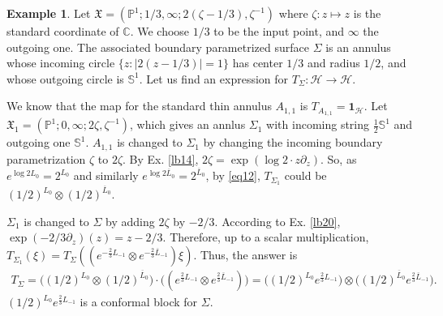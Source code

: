 \documentclass[12pt,a4paper,notitlepage]{article}
\theoremstyle{definition}
\newtheorem{eg}[df]{Example}
\theoremstyle{plain}
\newcommand{\fk}{\mathfrak}
\newcommand{\mc}{\mathcal}
\newcommand{\ovl}{\overline}
\newcommand{\id}{\mathbf{1}}
\newcommand{\Cbb}{\mathbb C}
\newcommand{\Pbb}{\mathbb P}
\newcommand{\Sbb}{{\mathbb S}}
\numberwithin{equation}{section}
\begin{document}
\begin{eg}
Let $\fk X=(\Pbb^1;1/3,\infty;2(\zeta-1/3),\zeta^{-1})$ where $\zeta:z\mapsto z$ is the standard coordinate of $\Cbb$. We choose $1/3$ to be the input point, and $\infty$ the outgoing one. The associated boundary parametrized surface $\Sigma$ is an annulus whose incoming circle $\{z:|2(z-1/3)|=1\}$ has center $1/3$ and radius $1/2$, and whose outgoing circle is $\Sbb^1$. Let us find an expression for $T_\Sigma:\mc H\rightarrow\mc H$.

We know that the map for the standard thin annulus $A_{1,1}$ is $T_{A_{1,1}}=\id_{\mc H}$. Let $\fk X_1=(\Pbb^1;0,\infty;2\zeta,\zeta^{-1})$, which gives an annlus $\Sigma_1$ with incoming string $\frac 12\Sbb^1$ and outgoing one $\Sbb^1$. $A_{1,1}$ is changed to $\Sigma_1$ by changing the incoming boundary parametrization $\zeta$ to $2\zeta$. By Ex. \ref{lb14}, $2\zeta=\exp(\log 2\cdot z\partial_z)$. So, as $e^{\log 2L_0}=2^{L_0}$ and similarly $e^{\log 2 \ovl L_0}=2^{\ovl L_0}$, by \eqref{eq12}, $T_{\Sigma_1}$ could be $(1/2)^{L_0}\otimes (1/2)^{\ovl L_0}$.

$\Sigma_1$ is changed to $\Sigma$ by adding $2\zeta$ by $-2/3$. According to Ex. \ref{lb20},  $\exp(-2/3\partial_z)(z)=z-2/3$. Therefore, up to a scalar multiplication, $T_{\Sigma_1}(\xi)=T_\Sigma((e^{-\frac 23 L_{-1}}\otimes e^{-\frac 23 \ovl L_{-1}})\xi)$. Thus, the answer is
\begin{align*}
T_\Sigma=\big((1/2)^{L_0}\otimes (1/2)^{\ovl L_0}\big)\cdot \big((e^{\frac 23 L_{-1}}\otimes e^{\frac 23 \ovl L_{-1}})\big)=\big((1/2)^{L_0}e^{\frac 23L_{-1}}\big)\otimes 	\big((1/2)^{\ovl L_0}e^{\frac 23\ovl L_{-1}}\big).
\end{align*}
$(1/2)^{L_0}e^{\frac 23L_{-1}}$ is a conformal block for $\Sigma$. \hfill\qedsymbol
\end{eg}










\subsection{}\label{lb28}
\end{document}
